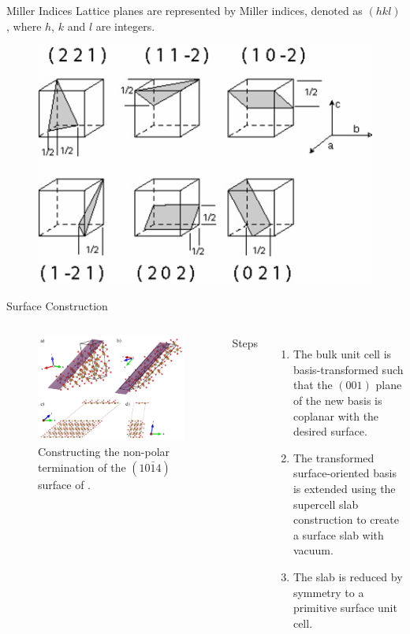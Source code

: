 \documentclass[aspectratio=169]{beamer}
\begin{document}
    \begin{frame}{Miller Indices}
        Lattice planes are represented by Miller indices, denoted as $(hkl)$, where $h$, $k$ and $l$ are integers.
        \begin{figure}
            \centering
            \includegraphics[width=0.5\linewidth]{lectures/figures/11_miller_indices.png}
        \end{figure}
    \end{frame}

    \begin{frame}{Surface Construction}
        \begin{columns}
            \begin{figure}
                \centering
                \includegraphics[width=\linewidth]{lectures/figures/11_surface_construction.png}
                \caption{Constructing the non-polar termination of the $(10\bar{1}4)$ surface of .\cite{sunEfficientCreationConvergence2013}}
            \end{figure}
            Steps
            \begin{enumerate}
                \item The bulk unit cell is basis-transformed such that the $(001)$ plane of the new basis is coplanar with the desired surface.
                \item The transformed surface-oriented basis is extended using the supercell slab construction to create a surface slab with vacuum.
                \item The slab is reduced by symmetry to a primitive surface unit cell.
            \end{enumerate}
        \end{columns}

    \end{frame}
\end{document}
